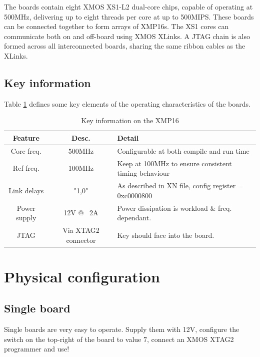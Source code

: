 \documentclass[12pt,a4paper,final,twoside]{article}
\begin{document}
The boards contain eight XMOS XS1-L2 dual-core chips, capable of operating at 500MHz, delivering up to eight threads per core at up to 500MIPS. These boards can be connected together to form arrays of XMP16s. The XS1 cores can communicate both on and off-board using XMOS XLinks. A JTAG chain is also formed across all interconnected boards, sharing the same ribbon cables as the XLinks.

\subsection{Key information}

Table \ref{tab:keyinfo} defines some key elements of the operating characteristics of the boards.

\begin{table}
\begin{tabular}{|c|c|p{2.5in}|}
\hline 
\textbf{Feature} & \textbf{Desc.} & \textbf{Detail} \\ 
\hline 
Core freq. & 500MHz & Configurable at both compile and run time \\ 
\hline 
Ref freq. & 100MHz & Keep at 100MHz to ensure consistent timing behaviour \\ 
\hline 
Link delays & "1,0" & As described in XN file, config register = 0xc0000800 \\ 
\hline 
Power supply & 12V @ ~2A & Power dissipation is workload \& freq. dependant. \\ 
\hline
JTAG & Via XTAG2 connector & Key should face into the board. \\
\hline 
\end{tabular}
\caption{Key information on the XMP16}
\label{tab:keyinfo}
\end{table}

\section{Physical configuration}

\subsection{Single board}

Single boards are very easy to operate. Supply them with 12V, configure the switch on the top-right of the board to value $7$, connect an XMOS XTAG2 programmer and use!
\end{document}
